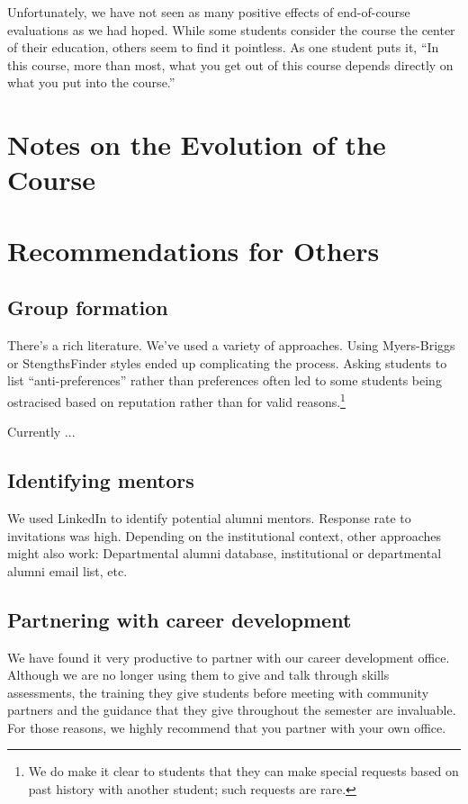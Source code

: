Unfortunately, we have not seen as many positive effects of
end-of-course evaluations as we had hoped.  While some students
consider the course the center of their education, others seem to
find it pointless.  As one student puts it, ``In this course, more
than most, what you get out of this course depends directly on what
you put into the course.''

\section{Notes on the Evolution of the Course}

\section{Recommendations for Others}

\subsection{Group formation}

There's a rich literature.  We've used a variety of approaches.  Using
Myers-Briggs or StengthsFinder styles ended up complicating the process.
Asking students to list ``anti-preferences'' rather than preferences
often led to some students being ostracised based on reputation rather
than for valid reasons.\footnote{We do make it clear to students that
they can make special requests based on past history with another student;
such requests are rare.}

Currently ...

\subsection{Identifying mentors}

We used LinkedIn to identify potential alumni mentors.  Response rate
to invitations was high.  Depending on the institutional context, other
approaches might also work: Departmental alumni database, institutional
or departmental alumni email list, etc.

\subsection{Partnering with career development}

We have found it very productive to partner with our career development
office.  Although we are no longer using them to give and talk through
skills assessments, the training they give students before meeting with
community partners and the guidance that they give throughout the semester
are invaluable.  For those reasons, we highly recommend that you partner
with your own office.

